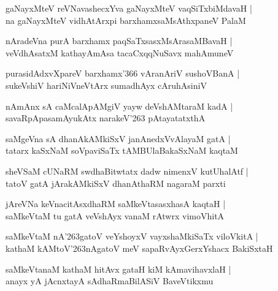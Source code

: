 \begin{shloka}
gaNayxMteV reVNavashecxYva gaNayxMteV vaqSiTxbiMdavaH |\\
na gaNayxMteV vidhAtArxpi barxhamxsaMsAthxpaneV PalaM
\end{shloka}

\begin{shloka}
nAradeVna purA barxhamx paqSaTxsasxMsArasaMBavaH |\\
veVdhAsatxM kathayAmAsa tacaCxqqNuSavx mahAmuneV
\end{shloka}

\begin{shloka}
purasidAdxvXpareV barxhamx\char'366 vAranAriV sushoVBanA |\\
sukeVshiV hariNiVneVtArx sumadhAyx cAruhAsiniV
\end{shloka}

\begin{shloka}
nAmAnx sA caMcalApAMgiV yayw deVshAMtaraM kadA |\\
savaRpApasamAyukAtx narakeV\char'263 pAtayatatxthA
\end{shloka}

\begin{shloka}
saMgeVna sA dhanAkAMkiSxV janAnedxVvAlayaM gatA |\\
tatarx kaSxNaM soVpaviSaTx tAMBUlaBakaSxNaM kaqtaM
\end{shloka}

\begin{shloka}
sheVSaM cUNaRM swdhaBitwtatx dadw nimenxV kutUhalAtf |\\
tatoV gatA jArakAMkiSxV dhanAthaRM nagaraM parxti
\end{shloka}

\begin{shloka}
jAreVNa keVnacitAsxdhaRM saMkeVtasasxhasA kaqtaH |\\
saMkeVtaM tu gatA veVshAyx vanaM rAtwrx vimoVhitA
\end{shloka}

\begin{shloka}
saMkeVtaM nA\char'263gatoV veYshoyxV vayxshaMkiSaTx viloVkitA |\\
kathaM kAMtoV\char'263nAgatoV meV sapaRvAyxGerxYshacx BakiSxtaH
\end{shloka}

\begin{shloka}
saMkeVtanaM kathaM hitAvx gataH kiM kAmavihavxlaH |\\
anayx yA jAcnxtayA sAdhaRmaBilASiV BaveVtikxmu
\end{shloka}


